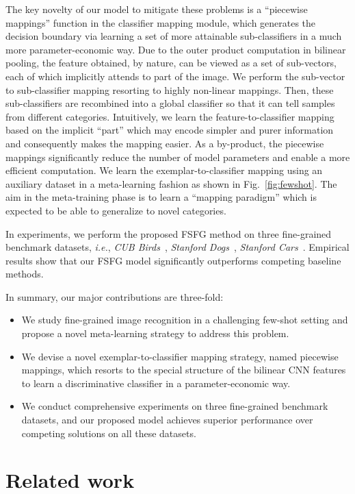 \documentclass[10pt,twocolumn,letterpaper]{article}
\begin{document}
The key novelty of our model to mitigate these problems is a ``piecewise mappings'' function in the classifier mapping module, which generates the decision boundary via learning a set of more attainable sub-classifiers in a much more parameter-economic way. Due to the outer product computation in bilinear pooling, the feature obtained, by nature, can be viewed as a set of sub-vectors, each of which implicitly attends to part of the image. We perform the sub-vector to sub-classifier mapping resorting to highly non-linear mappings. Then, these sub-classifiers are recombined into a global classifier so that it can tell samples from different categories. Intuitively, we learn the feature-to-classifier mapping based on the implicit ``part'' which may encode simpler and purer information and consequently makes the mapping easier. As a by-product, the piecewise mappings significantly reduce the number of model parameters and enable a more efficient computation. We learn the exemplar-to-classifier mapping using an auxiliary dataset in a meta-learning fashion as shown in Fig.~\ref{fig:fewshot}. The aim in the meta-training phase is to learn a ``mapping paradigm'' which is expected to be able to generalize to novel categories.

In experiments, we perform the proposed FSFG method on three fine-grained benchmark datasets, \emph{i.e.}, \emph{CUB Birds}~\cite{WahCUB200_2011}, \emph{Stanford Dogs}~\cite{Khosla11stanforddogs}, \emph{Stanford Cars}~\cite{cars}. Empirical results show that our FSFG model significantly outperforms competing baseline methods.

In summary, our major contributions are three-fold:
\begin{itemize}
\item We study fine-grained image recognition in a challenging few-shot setting and propose a novel meta-learning strategy to address this problem.
\item We devise a novel exemplar-to-classifier mapping strategy, named piecewise mappings, which resorts to the special structure of the bilinear CNN features to learn a discriminative classifier in a parameter-economic way.
\item We conduct comprehensive experiments on three fine-grained benchmark datasets, and our proposed model achieves superior performance over competing solutions on all these datasets.
\end{itemize}


\section{Related work}\label{sec:related}
\end{document}
